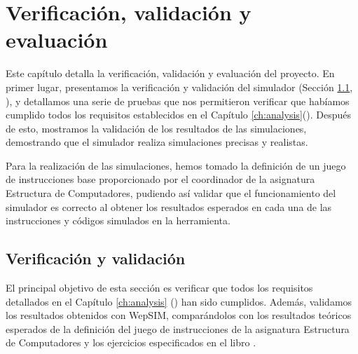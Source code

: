 \chead[]{}
\renewcommand{\headrulewidth}{0.5pt}

\lfoot[]{}
\cfoot[]{}
\rfoot[]{}
\renewcommand{\footrulewidth}{0pt}

\chapter{Verificación, validación y evaluación}
\label{ch:verification_validation_and_evaluation}


Este capítulo detalla la verificación, validación y evaluación del proyecto. En primer lugar, presentamos la verificación y validación del simulador (Sección \ref{sec:verification_and_validation}, \textit{}), y detallamos una serie de pruebas que nos permitieron verificar que habíamos cumplido todos los requisitos establecidos en el Capítulo  \ref{ch:analysis}(\textit{}). Después de esto, mostramos la validación de los resultados de las simulaciones, demostrando que el simulador realiza simulaciones precisas y realistas.

Para la realización de las simulaciones, hemos tomado la definición de un juego de instrucciones base proporcionado por el coordinador de la asignatura Estructura de Computadores, pudiendo así validar que el funcionamiento del simulador es correcto al obtener los resultados esperados en cada una de las instrucciones y códigos simulados en la herramienta. 

\section{Verificación y validación}
\label{sec:verification_and_validation}

El principal objetivo de esta sección es verificar que todos los requisitos detallados en el Capítulo \ref{ch:analysis} (\textit{}) han sido cumplidos. Además, validamos los resultados obtenidos con WepSIM, comparándolos con los resultados teóricos esperados de la definición del juego de instrucciones de la asignatura Estructura de Computadores y los ejercicios especificados en el libro \cite{perez2015problemas}.


